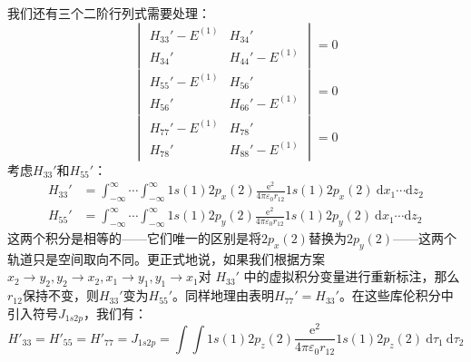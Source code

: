     我们还有三个二阶行列式需要处理：
    \begin{equation}
        \begin{vmatrix}
            H_{33}' - E^{\left(1\right)} & H_{34}' \\
            H_{34}' & H_{44}' - E^{\left(1\right)}
        \end{vmatrix} = 0
        \label{eq:9.105}
    \end{equation}
    \begin{equation}
        \begin{vmatrix}
            H_{55}' - E^{\left(1\right)} & H_{56}' \\
            H_{56}' & H_{66}' - E^{\left(1\right)}
        \end{vmatrix} = 0
        \label{eq:9.106}
    \end{equation}
    \begin{equation}
        \begin{vmatrix}
            H_{77}' - E^{\left(1\right)} & H_{78}' \\
            H_{78}' & H_{88}' - E^{\left(1\right)}
        \end{vmatrix} = 0
        \label{eq:9.107}
    \end{equation}
    考虑$H_{33}'$和$H_{55}'$：
    \begin{equation*}
        \begin{aligned}
            H_{33}' &= \int_{-\infty}^{\infty}\cdots\int_{-\infty}^{\infty} 1s(1)2p_x(2)\frac{\mathrm{e}^2}{4\pi\varepsilon_0r_{12}} 1s(1)2p_x(2)\:\mathrm{d}x_1\cdots\mathrm{d}z_2 \\
            H_{55}' &= \int_{-\infty}^{\infty}\cdots\int_{-\infty}^{\infty} 1s(1)2p_y(2)\frac{\mathrm{e}^2}{4\pi\varepsilon_0r_{12}} 1s(1)2p_y(2)\:\mathrm{d}x_1\cdots\mathrm{d}z_2
        \end{aligned}
    \end{equation*}
    这两个积分是相等的——它们唯一的区别是将$2p_x\left(2\right)$替换为$2p_y\left(2\right)$——这两个轨道只是空间取向不同。更正式地说，如果我们根据方案$x_2 \to y_2, y_2 \to x_2, x_1 \to y_1, y_1 \to x_1$对 $H_{33}'$ 中的虚拟积分变量进行重新标注，那么$r_{12}$保持不变，则$H_{33}'$变为$H_{55}'$。同样地理由表明$H_{77}' = H_{33}'$。在这些库伦积分中引入符号$J_{1s2p}$，我们有：
    \begin{equation*}
        H'_{33} = H'_{55} = H'_{77} = J_{1s2p} = \int\int 1s(1)2p_z(2)\frac{\mathrm{e}^2}{4\pi\varepsilon_0 r_{12}}1s(1)2p_z(2) \:\mathrm{d}\tau_1\: \mathrm{d}\tau_2
    \end{equation*}
